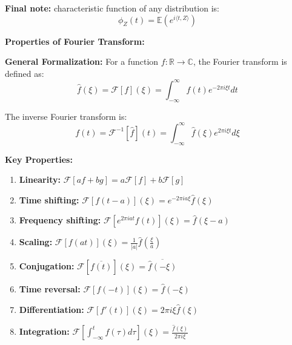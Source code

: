 \documentclass[a4paper, 12pt]{article}
\begin{document}
\begin{answerenum}
        \item \textbf{Final note:} characteristic function of any distribution is:
            \[ \phi_Z(t) = \mathbb{E}(e^{i\langle t,Z\rangle}) \]
            
            \textbf{Properties of Fourier Transform:}

            \textbf{General Formalization:}
            For a function $f: \mathbb{R} \to \mathbb{C}$, the Fourier transform is defined as:
            \[ \hat{f}(\xi) = \mathcal{F}[f](\xi) = \int_{-\infty}^{\infty} f(t) e^{-2\pi i \xi t} dt \]

            The inverse Fourier transform is:
            \[ f(t) = \mathcal{F}^{-1}[\hat{f}](t) = \int_{-\infty}^{\infty} \hat{f}(\xi) e^{2\pi i \xi t} d\xi \]
            
            
            \textbf{Key Properties:}
            \begin{enumerate}
                \item \textbf{Linearity:} $\mathcal{F}[af + bg] = a\mathcal{F}[f] + b\mathcal{F}[g]$
                
                \item \textbf{Time shifting:} $\mathcal{F}[f(t-a)](\xi) = e^{-2\pi i a \xi} \hat{f}(\xi)$
                
                \item \textbf{Frequency shifting:} $\mathcal{F}[e^{2\pi i a t} f(t)](\xi) = \hat{f}(\xi - a)$
                
                \item \textbf{Scaling:} $\mathcal{F}[f(at)](\xi) = \frac{1}{|a|} \hat{f}\left(\frac{\xi}{a}\right)$
                
                \item \textbf{Conjugation:} $\mathcal{F}[\overline{f(t)}](\xi) = \overline{\hat{f}(-\xi)}$
                
                \item \textbf{Time reversal:} $\mathcal{F}[f(-t)](\xi) = \hat{f}(-\xi)$
                
                \item \textbf{Differentiation:} $\mathcal{F}[f'(t)](\xi) = 2\pi i \xi \hat{f}(\xi)$
                
                \item \textbf{Integration:} $\mathcal{F}\left[\int_{-\infty}^t f(\tau) d\tau\right](\xi) = \frac{\hat{f}(\xi)}{2\pi i \xi}$
                

\end{enumerate}
\end{answerenum}
\end{document}
